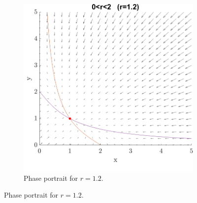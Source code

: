 \documentclass[a4paper,11pt]{article}
\begin{document}
\begin{figure}[H]
{	\begin{subfigure}[b]{0.5\textwidth}
		\includegraphics[width=\textwidth]{0r2.png}
		\caption{Phase portrait for $r=1.2$.}
		\label{fig:0r2}
	\end{subfigure}
	}
\end{figure}
\end{document}
